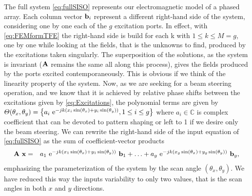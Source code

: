 \par The full system \eqref{eq:fullSISO} represents our electromagnetic model of a phased array. Each column vector $\mathbf{b}_i$ represent a different right-hand side of the system, considering one by one each of the $g$ excitation ports. In effect, with \eqref{eq:FEMformTFE} the right-hand side is build for each k with $1 \leq k \leq M=g$, one by one while looking at the fields, that is the unknowns to find, produced by the excitations taken singularly. The superposition of the solutions, as the system is invariant ($\mathbf{A}$ remains the same all along this process), gives the fields produced by the ports excited contemporaneously. This is obvious if we think of the linearity property of the system. Now, as we are seeking for a beam steering operation, and we know that it is achieved by relative phase shifts between the excitations given by \eqref{eq:Excitations}, the polynomial terms are given by $\Theta (\theta_x,\theta_y) = \left \{  a_i \ \mathrm{e}^{-jk ( x_i \sin(\theta_{x}) + y_i \sin(\theta_{y}))}, 1 \leq i \leq g \right \}$ where $a_i \in \mathbb{C}$ is complex coefficient that can be devoted to pattern shaping \cite{SelleriETA, MilliganMAD} or left to 1 if we desire only the beam steering. We can rewrite the right-hand side of the input equation of \eqref{eq:fullSISO} as the sum of coefficient-vector products
\begin{eqnarray}
\label{eq:scanAngle}
\mat{A} \ \vect{x}  & = & a_1 \ \mrm{e}^{-jk ( x_1 \sin(\theta_{x}) + y_1 \sin(\theta_{y}))} \ \vect{b}_1 + \ldots + a_g \ \mrm{e}^{-jk ( x_g \sin(\theta_{x}) + y_g \sin(\theta_{y}))} \ \vect{b}_g,
\end{eqnarray} emphasizing the parameterization of the system by the scan angle $(\theta_{x}, \theta_{y})$. We have reduced this way the inputs variability to only two values, that is the scan angles in both $x$ and $y$ directions.

